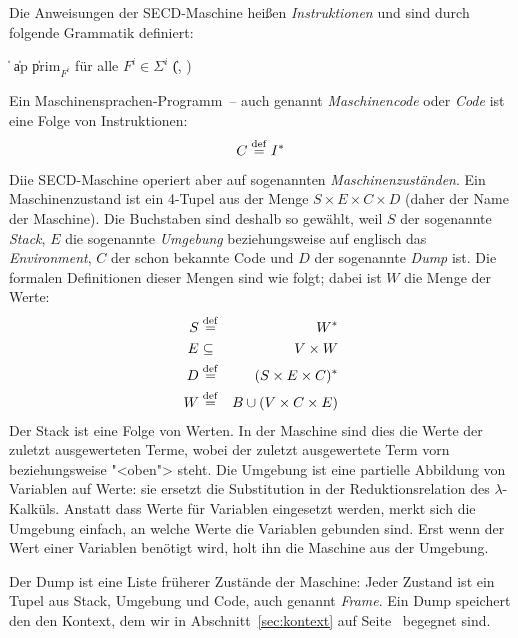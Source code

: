 \begin{definition}\label{def:secd-code}
  Die Anweisungen der SECD-Maschine heißen
  \textit{Instruktionen} und sind durch folgende Grammatik definiert:
  \begin{grammar}
     \: 
    \> \| 
    \> \| ap
    \> \| prim$_{F^i}$ \textrm{für alle $F^i \in \Sigma^i$}
    \> \| (, )
  \end{grammar}
  Ein Maschinensprachen-Programm~-- auch genannt
  \textit{Maschinencode} oder
  \textit{Code} ist eine Folge von Instruktionen:
  \begin{displaymath}
    C \stackrel{\rm def}{=} I^\ast
  \end{displaymath}
\end{definition}
%
Diie SECD-Maschine operiert aber auf sogenannten
\textit{Maschinenzuständen}.  Ein Maschinenzustand ist ein 4-Tupel aus der
Menge $S\times E\times C\times D$ (daher der Name der Maschine).  Die
Buchstaben sind deshalb so gewählt, weil $S$ der sogenannte
\textit{Stack}, $E$ die sogenannte
\textit{Umgebung} beziehungsweise auf englisch das
\textit{Environment}, $C$ der schon bekannte
Code und $D$ der
sogenannte \textit{Dump} ist.  Die formalen Definitionen
dieser Mengen sind wie folgt; dabei ist $W$ die Menge der Werte:
%
\begin{eqnarray*}
  S &\stackrel{\rm def}{=}& W^\ast\\
  E &\subseteq& V\times W\\
  D &\stackrel{\rm def}{=}& (S\times E \times C)^\ast\\
  W &\stackrel{\rm def}{=}& B \cup (V\times C\times E)
\end{eqnarray*}
%
Der Stack ist eine Folge von Werten.  In der Maschine sind dies
die Werte der zuletzt ausgewerteten Terme, wobei der zuletzt
ausgewertete Term vorn beziehungsweise "<oben"> steht.  Die Umgebung ist eine
partielle Abbildung von Variablen auf Werte: sie ersetzt die
Substitution in der Reduktionsrelation des $\lambda$-Kalküls.  Anstatt
dass Werte für Variablen eingesetzt werden, merkt sich die Umgebung
einfach, an welche Werte die Variablen gebunden sind.  Erst wenn der
Wert einer Variablen benötigt wird, holt ihn die Maschine aus der
Umgebung.

Der Dump ist eine Liste früherer Zustände der Maschine:
Jeder Zustand ist ein Tupel aus Stack, Umgebung und Code, auch genannt
\textit{Frame}. Ein Dump speichert den den
Kontext, dem wir in Abschnitt~\ref{sec:kontext} auf
Seite~\pageref{sec:kontext} begegnet sind.

